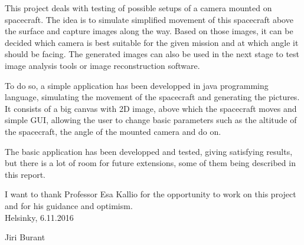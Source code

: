 \documentclass[english,12pt,a4paper,pdftex,elec,utf8]{aaltothesis}
\begin{document}
\makecoverpage



\begin{abstractpage}[english]
This project deals with testing of possible setups of a camera mounted on spacecraft. The idea is to simulate simplified movement of this spacecraft above the surface 
and capture images along the way. Based on those images, it can be decided which camera is best suitable for the given mission and at which angle it should be facing. 
The generated images can also be used in the next stage to test image analysis tools or image reconstruction software. 

To do so, a simple application has been developped in java programming language, simulating the movement of the spacecraft and generating the pictures. It consists of a big canvas with 
2D image, above which the spacecraft moves and simple GUI, allowing the user to change basic parameters such as the altitude of the spacecraft, the angle of the mounted camera and do on.

The basic application has been developped and tested, giving satisfying results, but there is a lot of room for future extensions, some of them being described in this report.
\end{abstractpage}

\newpage
%


I want to thank Professor Esa Kallio for the opportunity to work on this project and for his guidance and optimism.\\

\vspace{5cm}
Helsinky, 6.11.2016

\vspace{5mm}
{\hfill Jiri Burant \hspace{1cm}}
\end{document}
